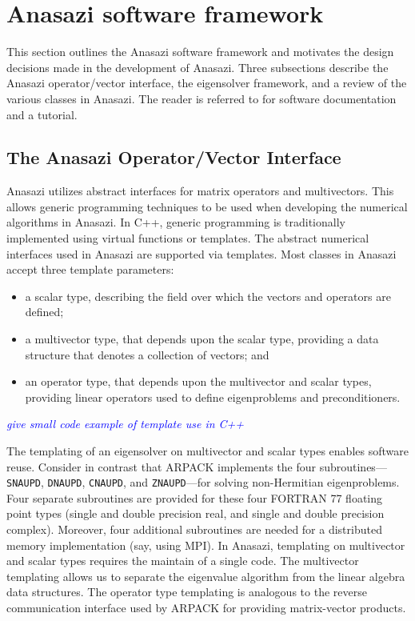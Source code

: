 \documentclass[acmtoms]{acmtrans2m}
\newcounter{algorithm}
\newcommand{\cbcomm}[1]{\textcolor{blue}{\emph{#1}}}
\begin{document}
\section{Anasazi software framework}
\label{sec:framework}

This section outlines the Anasazi software framework and motivates
the design decisions made in the development of Anasazi. Three
subsections describe the Anasazi operator/vector interface, the
eigensolver framework, and a review of the various classes in
Anasazi. The reader is referred to
\cite{Trilinos:anasazi,Trilinos-Tutorial} for software documentation
and a tutorial.

\subsection{The Anasazi Operator/Vector Interface}
\label{sec:anasazi:opvec}

Anasazi utilizes abstract interfaces for matrix operators and
multivectors. This allows generic programming techniques to be used
when developing the numerical algorithms in Anasazi. In C++, generic
programming is traditionally implemented using virtual
functions or templates. The abstract numerical interfaces used
in Anasazi are supported via templates. Most classes in Anasazi accept
three template parameters:
\begin{itemize}
\item
a scalar type, describing the field over which the vectors and
operators are defined;
\item
a multivector type, that depends upon the scalar type, providing a
data structure that denotes a collection of vectors; and
\item
an operator type, that depends upon the multivector and scalar types,
providing linear operators used to define eigenproblems and
preconditioners.
\end{itemize}

\cbcomm{give small code example of template use in C++}

The templating of an eigensolver on multivector and scalar types
enables software reuse. Consider in contrast that ARPACK implements
the four subroutines---\texttt{SNAUPD}, \texttt{DNAUPD},
\texttt{CNAUPD}, and \texttt{ZNAUPD}---for solving non-Hermitian
eigenproblems. Four separate subroutines are provided for these four
FORTRAN 77 floating point types (single and double precision real, and
single and double precision complex). Moreover, four additional
subroutines are needed for a distributed memory implementation (say,
using MPI). In Anasazi, templating on multivector and scalar types
requires the maintain of a single code. The multivector templating
allows us to separate the eigenvalue algorithm from the linear algebra
data structures. The operator type templating is analogous to the
reverse communication interface used by ARPACK for providing
matrix-vector products.
\end{document}
